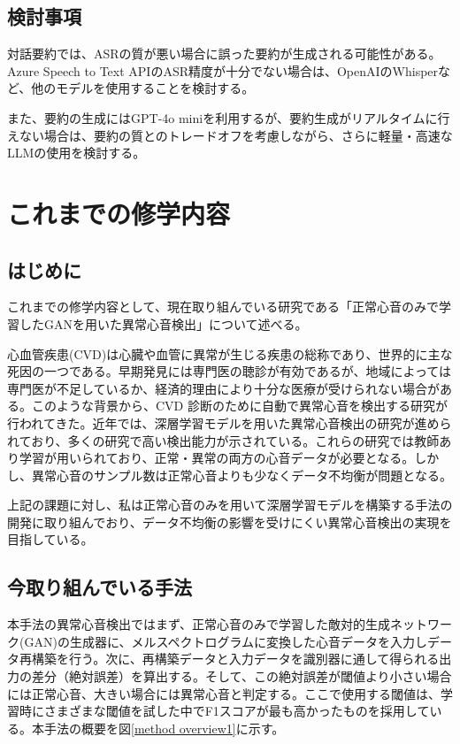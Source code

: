 \documentclass[a4j,10pt, twocolumn]{jarticle}
\begin{document}
\subsection{検討事項}
対話要約では、ASRの質が悪い場合に誤った要約が生成される可能性がある。Azure Speech to Text APIのASR精度が十分でない場合は、OpenAIのWhisperなど、他のモデルを使用することを検討する。

また、要約の生成にはGPT-4o miniを利用するが、要約生成がリアルタイムに行えない場合は、要約の質とのトレードオフを考慮しながら、さらに軽量・高速なLLMの使用を検討する。

\section{これまでの修学内容}
\subsection{はじめに}
これまでの修学内容として、現在取り組んでいる研究である「正常心音のみで学習したGANを用いた異常心音検出」について述べる。

心血管疾患(CVD)は心臓や血管に異常が生じる疾患の総称であり、世界的に主な死因の一つである。早期発見には専門医の聴診が有効であるが、地域によっては専門医が不足しているか、経済的理由により十分な医療が受けられない場合がある。このような背景から、CVD 診断のために自動で異常心音を検出する研究が行われてきた。近年では、深層学習モデルを用いた異常心音検出の研究が進められており、多くの研究で高い検出能力が示されている。これらの研究では教師あり学習が用いられており、正常・異常の両方の心音データが必要となる。しかし、異常心音のサンプル数は正常心音よりも少なくデータ不均衡が問題となる。

上記の課題に対し、私は正常心音のみを用いて深層学習モデルを構築する手法の開発に取り組んでおり、データ不均衡の影響を受けにくい異常心音検出の実現を目指している。

\subsection{今取り組んでいる手法}
本手法の異常心音検出ではまず、正常心音のみで学習した敵対的生成ネットワーク(GAN)の生成器に、メルスペクトログラムに変換した心音データを入力しデータ再構築を行う。次に、再構築データと入力データを識別器に通して得られる出力の差分（絶対誤差）を算出する。そして、この絶対誤差が閾値より小さい場合には正常心音、大きい場合には異常心音と判定する。ここで使用する閾値は、学習時にさまざまな閾値を試した中でF1スコアが最も高かったものを採用している。本手法の概要を図\ref{method overview1}に示す。
\end{document}
